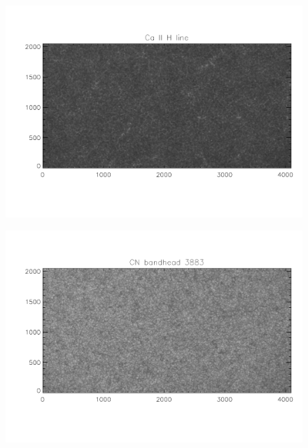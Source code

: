 \documentclass[a4paper,10pt]{report}
\begin{document}
\begin{figure}[H]
\includegraphics[width=\linewidth]{file4.pdf}
\end{figure}

\begin{figure}[H]
\includegraphics[width=\linewidth]{file5.pdf}
\end{figure}
\end{document}
